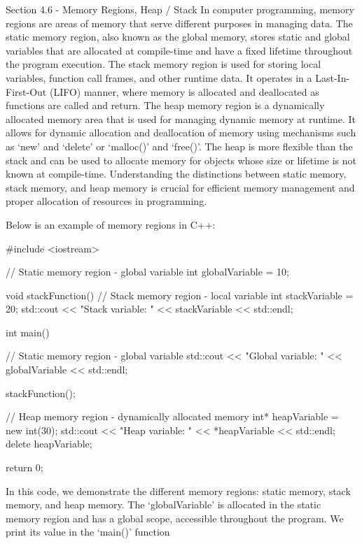 \begin{notes}{Section 4.6 - Memory Regions, Heap / Stack}
    In computer programming, memory regions are areas of memory that serve different purposes in managing data. The static memory region, also known as the global memory, stores static and global variables that are allocated at compile-time and have a fixed 
    lifetime throughout the program execution. The stack memory region is used for storing local variables, function call frames, and other runtime data. It operates in a Last-In-First-Out (LIFO) manner, where memory is allocated and deallocated as functions 
    are called and return. The heap memory region is a dynamically allocated memory area that is used for managing dynamic memory at runtime. It allows for dynamic allocation and deallocation of memory using mechanisms such as `new' and `delete' or `malloc()' 
    and `free()'. The heap is more flexible than the stack and can be used to allocate memory for objects whose size or lifetime is not known at compile-time. Understanding the distinctions between static memory, stack memory, and heap memory is crucial for 
    efficient memory management and proper allocation of resources in programming.
    
    \begin{highlight}
        Below is an example of memory regions in C++:
        
    \begin{code}[C++]   
    #include <iostream>

    // Static memory region - global variable
    int globalVariable = 10;
    
    void stackFunction() {
        // Stack memory region - local variable
        int stackVariable = 20;
        std::cout << "Stack variable: " << stackVariable << std::endl;
    }
    
    int main() {
        // Static memory region - global variable
        std::cout << "Global variable: " << globalVariable << std::endl;
    
        stackFunction();
    
        // Heap memory region - dynamically allocated memory
        int* heapVariable = new int(30);
        std::cout << "Heap variable: " << *heapVariable << std::endl;
        delete heapVariable;
    
        return 0;
    }
    \end{code}
        In this code, we demonstrate the different memory regions: static memory, stack memory, and heap memory. The `globalVariable' is allocated in the static memory region and has a global scope, accessible throughout the program. We print its value in 
        the `main()' function
        

\end{highlight}
\end{notes}
